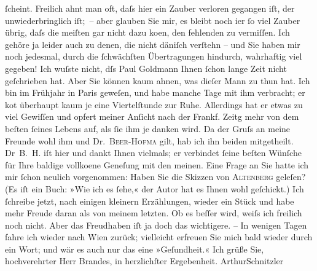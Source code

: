 \begin{ledgroupsized}[t]{13cm}
               ſcheint. {\pb}Freilich ahnt man oft, daſs hier ein
               Zauber verloren gegangen iſt, der unwiederbringlich iſt; – aber glauben Sie mir, es
               bleibt noch i{\geminationm}er ſo viel Zauber übrig, daſs die meiſten
               gar nicht dazu ko{\geminationm}en, den fehlenden zu vermiſſen. Ich
               gehöre ja leider auch zu denen, die nicht däniſch verſtehn – und Sie haben mir noch jedesmal, durch die ſchwächſten
               Übertragungen hindurch, wahrhaftig {\pb}viel
               gegeben!\pend
           \pstart
           Ich wuſste nicht, dſs Paul Goldmann Ihnen
               ſchon lange Zeit nicht geſchrieben hat. Aber Sie können kaum ahnen, was dieſer Mann
               zu thun hat. Ich bin im Frühjahr in Paris
               geweſen, und habe manche Tage mit ihm verbracht; er ko{\geminationm}t
               überhaupt kaum je eine Viertelſtunde zur Ruhe. Allerdings hat er etwas zu viel
               Gewiſſen und opfert meiner An{\pb}ſicht nach der Frankf. Zeitg mehr von dem beſten ſeines Lebens
               auf, als ſie ihm je danken wird. Da der Gruſs an meine Freunde wohl ihm und Dr. \textsc{Beer-Hofma{\geminationn}} gilt, hab ich ihn beiden mitgetheilt. Dr \textsc{B. H.} iſt hier und dankt Ihnen vielmals; er verbindet ſeine beſten Wünſche für Ihre
               baldige vollko{\geminationm}ene Geneſung mit den meinen.\pend
           \pstart
           {\pb}Eine Frage an Sie hatte ich mir ſchon neulich
               vorgenommen: Haben Sie die Skizzen von \textsc{Altenberg} geleſen? (Es iſt ein Buch: »Wie ich es
                  ſehe,« der Autor hat es Ihnen wohl geſchickt.)\pend
           \pstart
           Ich ſchreibe jetzt, nach einigen kleinern Erzählungen, wieder ein Stück und habe mehr
               Freude daran als von meinem letzten. Ob es beſſer wird,  weiſs ich freilich {\pb}noch nicht. Aber
               das Freudhaben iſt ja doch das wichtigere. –\pend
           \pstart
           In wenigen Tagen fahre ich wieder nach Wien
               zurück; vielleicht erfreuen Sie mich bald wieder durch ein Wort; und wär es auch nur
               das eine »Geſundheit.«\pend
           \pstart Ich grüße Sie, hochverehrter Herr Brandes, in herzlichſter Ergebenheit.
                  \spacefill\mbox{ArthurSchnitzler}\pend{}
         

\end{ledgroupsized}
